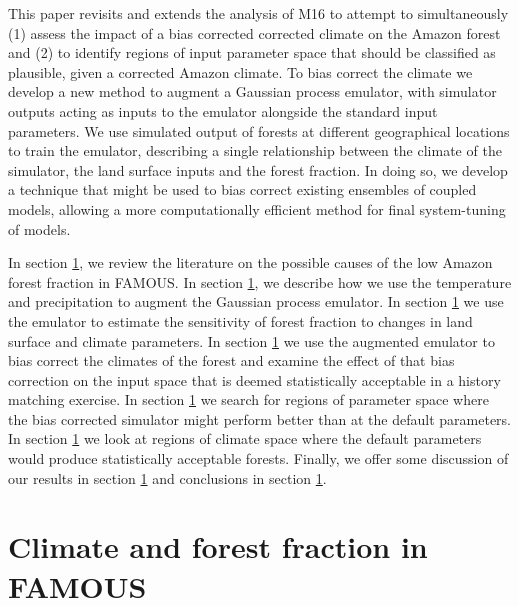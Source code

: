\documentclass[gmd, manuscript]{copernicus}
\begin{document}
This paper revisits and extends the analysis of M16 to attempt to simultaneously (1) assess the impact of a bias corrected corrected climate on the Amazon forest and (2) to identify regions of input parameter space that should be classified as plausible, given a corrected Amazon climate. To bias correct the climate we develop a new method to augment a Gaussian process emulator, with simulator outputs acting as inputs to the emulator alongside the standard input parameters.  We use simulated output of forests at different geographical locations to train the emulator, describing a single relationship between the climate of the simulator, the land surface inputs and the forest fraction. In doing so, we develop a technique that might be used to bias correct existing ensembles of coupled models, allowing a more computationally efficient method for final system-tuning of models. 

In section \ref{}, we review the literature on the possible causes of the low Amazon forest fraction in FAMOUS. In section \ref{}, we describe how we use the temperature and precipitation to augment the Gaussian process emulator. In section \ref{} we use the emulator to estimate the sensitivity of forest fraction to changes in land surface and climate parameters. In section \ref{} we use the augmented emulator to bias correct the climates of the forest and examine the effect of that bias correction on the input space that is deemed statistically acceptable in a history matching exercise. In section \ref{} we search for regions of parameter space where the bias corrected simulator might perform better than at the default parameters. In section \ref{} we look at regions of climate space where the default parameters would produce statistically acceptable forests. Finally, we offer some discussion of our results in section \ref{} and conclusions in section \ref{}.

\section{Climate and forest fraction in FAMOUS}
\end{document}
